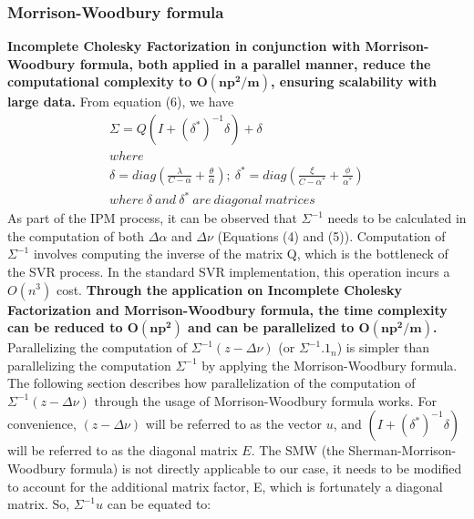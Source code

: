 \documentclass[12pt]{article}
\begin{document}
\subsubsection{Morrison-Woodbury formula}  
\label{Morrison-Woodbury formula}
  {\bf Incomplete Cholesky Factorization in conjunction with Morrison-Woodbury formula, both applied in a parallel manner, reduce the computational complexity to $\bm{O(np^2/m)}$, ensuring scalability with large data.}
  \newline\newline
From equation (6), we have
\begin{gather*} \Sigma={Q(I+(\delta^*)^{-1}\delta) + \delta}\\
where \\
\delta=diag(\frac{\lambda}{C-\alpha} + \frac{\theta}{\alpha});\   \delta^*=diag(\frac{\xi}{C-\alpha^*} + \frac{\phi}{\alpha^*})\\
where\ \delta \ and\ \delta^* \ are\ diagonal\ matrices
\end{gather*} 
As part of the IPM process, it can be observed that $\Sigma^{-1}$ needs to be calculated in the computation of both $\Delta \alpha$ and $\Delta \nu$ (Equations (4) and (5)). Computation of $\Sigma^{-1}$ involves computing the inverse of the matrix Q, which is the bottleneck of the SVR process. In the standard SVR implementation, this operation incurs a $O(n^3)$ cost. 
\newline\newline
{\bf Through the application on Incomplete Cholesky Factorization and Morrison-Woodbury formula, the time complexity can be reduced to $\bm{O(np^2)}$ and can be parallelized to $\bm{O(np^2/m)}$.}
\newline
\newline 
Parallelizing the computation of $\Sigma^{-1}(z - \Delta\nu)$ (or $\Sigma^{-1}.1_{n}$) is simpler than parallelizing the computation $\Sigma^{-1}$ by applying the Morrison-Woodbury formula. 
The following section describes how parallelization of the computation of $\Sigma^{-1}(z - \Delta\nu)$ through the usage of Morrison-Woodbury formula works.
\newline\newline
For convenience, $(z - \Delta\nu)$ will be referred to as the vector $u$, and $(I+(\delta^*)^{-1}\delta)$ will be referred to as the diagonal matrix $E$.
\newline\newline
The SMW (the Sherman-Morrison-Woodbury formula) is not directly applicable to our case, it needs to be modified to account for the additional matrix factor, E, which is fortunately a diagonal matrix. So, $\Sigma^{-1}u$ can be equated to:
\end{document}
